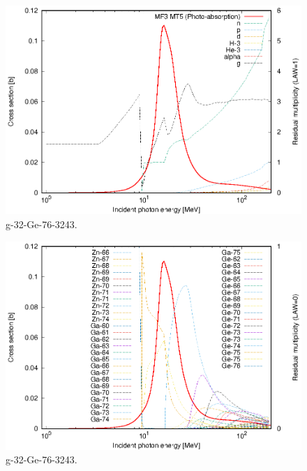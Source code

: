 \begin{figure}
 \includegraphics[width=\linewidth]{eps/g_32-Ge-76_3243.eps}
  \caption{g-32-Ge-76-3243.}
\end{figure}
\begin{figure}
 \includegraphics[width=\linewidth]{eps-law0/g_32-Ge-76_3243.eps}
 \caption{g-32-Ge-76-3243.}
\end{figure}
\newpage \clearpage

